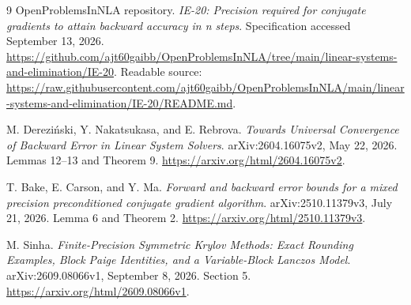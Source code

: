 \documentclass[11pt]{article}
\theoremstyle{remark}\newtheorem{remark}[theorem]{Remark}
\begin{document}
\begin{thebibliography}{9}
OpenProblemsInNLA repository.
\emph{IE-20: Precision required for conjugate gradients to attain backward
accuracy in n steps}. Specification accessed September 13, 2026.
\url{https://github.com/ajt60gaibb/OpenProblemsInNLA/tree/main/linear-systems-and-elimination/IE-20}.
Readable source:
\url{https://raw.githubusercontent.com/ajt60gaibb/OpenProblemsInNLA/main/linear-systems-and-elimination/IE-20/README.md}.

M. Derezi\'nski, Y. Nakatsukasa, and E. Rebrova.
\emph{Towards Universal Convergence of Backward Error in Linear System Solvers}.
arXiv:2604.16075v2, May 22, 2026. Lemmas 12--13 and Theorem 9.
\url{https://arxiv.org/html/2604.16075v2}.

T. Bake, E. Carson, and Y. Ma.
\emph{Forward and backward error bounds for a mixed precision
preconditioned conjugate gradient algorithm}.
arXiv:2510.11379v3, July 21, 2026. Lemma 6 and Theorem 2.
\url{https://arxiv.org/html/2510.11379v3}.

M. Sinha.
\emph{Finite-Precision Symmetric Krylov Methods: Exact Rounding Examples,
Block Paige Identities, and a Variable-Block Lanczos Model}.
arXiv:2609.08066v1, September 8, 2026. Section 5.
\url{https://arxiv.org/html/2609.08066v1}.
\end{thebibliography}
\end{document}
